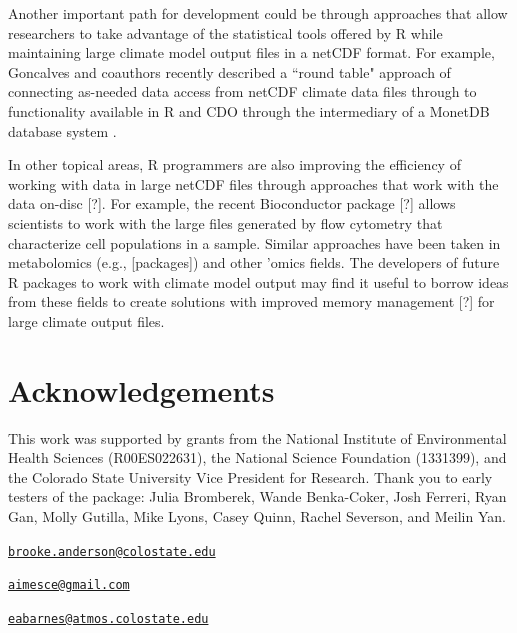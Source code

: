 Another important path for development could be through approaches that
allow researchers to take advantage of the statistical tools offered by
R while maintaining large climate model output files in a netCDF format.
For example, Goncalves and coauthors recently described a ``round table"
approach of connecting as-needed data access from netCDF climate data
files through to functionality available in R and CDO through the
intermediary of a MonetDB database system \citep{goncalves2015round}.

In other topical areas, R programmers are also improving the efficiency
of working with data in large netCDF files through approaches that work
with the data on-disc {[}?{]}. For example, the recent Bioconductor
package  {[}?{]} allows scientists to work with the large
files generated by flow cytometry that characterize cell populations in
a sample. Similar approaches have been taken in metabolomics (e.g.,
{[}packages{]}) and other 'omics fields. The developers of future R
packages to work with climate model output may find it useful to borrow
ideas from these fields to create solutions with improved memory
management {[}?{]} for large climate output files.

\section{Acknowledgements}\label{acknowledgements}

This work was supported by grants from the National Institute of
Environmental Health Sciences (R00ES022631), the National Science
Foundation (1331399), and the Colorado State University Vice President
for Research. Thank you to early testers of the package: Julia
Bromberek, Wande Benka-Coker, Josh Ferreri, Ryan Gan, Molly Gutilla,
Mike Lyons, Casey Quinn, Rachel Severson, and Meilin Yan.



\address{%
G. Brooke Anderson\\
Colorado State University\\
Department of Environmental \& Radiological Health Sciences\\ 1681 Campus Delivery\\ Fort Collins, Colorado 80523\\
}
\href{mailto:brooke.anderson@colostate.edu}{\nolinkurl{brooke.anderson@colostate.edu}}

\address{%
Colin Eason\\
Colorado State University\\
Department of Computer Science\\ 1873 Campus Delivery\\ Fort Collins, Colorado 80523\\
}
\href{mailto:aimesce@gmail.com}{\nolinkurl{aimesce@gmail.com}}

\address{%
Elizabeth A. Barnes\\
Colorado State University\\
Department of Atmospheric Science\\ 1371 Campus Delivery\\ Fort Collins, CO 80523\\
}
\href{mailto:eabarnes@atmos.colostate.edu}{\nolinkurl{eabarnes@atmos.colostate.edu}}

